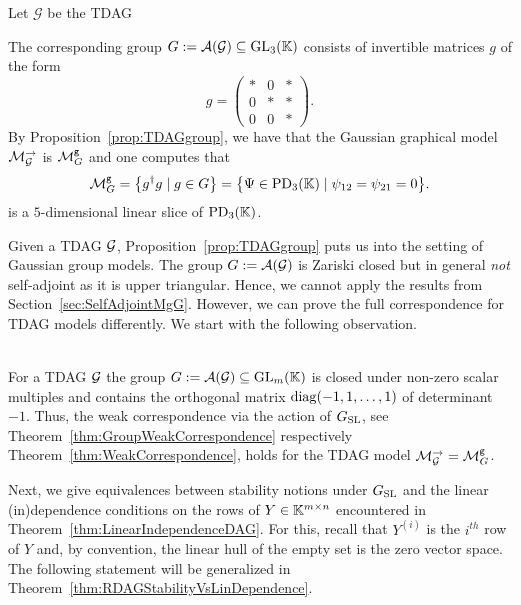 \begin{example}\label{ex:path1}
	Let $\mathcal{G}$ be the TDAG
	The corresponding group $G := \mathcal{A}(\mathcal{G}) \subseteq \operatorname{GL}_3(\mathbb K)$ consists of invertible matrices $g$ of the form
	\[g = \begin{pmatrix} * & 0 & * \\ 0 & * & * \\ 0 & 0 & * \end{pmatrix}.
	\]
	By Proposition~\ref{prop:TDAGgroup}, we have that the Gaussian graphical model $\mathcal{M}_{\mathcal{G}}^{\to}$ is $\mathcal{M}^{\mathtt{g}}_G$ and one computes that
	\begin{equation*}
		\mathcal{M}^{\mathtt{g}}_G = \big\{ g^{\dagger} g \mid g \in G \big\} = \big\{ \Psi \in \operatorname{PD}_3(\mathbb K) \mid \psi_{12}=\psi_{21}=0 \big\}.
	\end{equation*}
	is a $5$-dimensional linear slice of $\operatorname{PD}_3(\mathbb K)$.
	\hfill\exSymbol
\end{example}


Given a TDAG $\mathcal{G}$, Proposition~\ref{prop:TDAGgroup} puts us into the setting of Gaussian group models. 
The group $G := \mathcal{A}(\mathcal{G})$ is Zariski closed but in general \emph{not} self-adjoint as it is upper triangular. 
Hence, we cannot apply the results from Section~\ref{sec:SelfAdjointMgG}. However, we can prove the full correspondence for TDAG models differently. We start with the following observation.

\begin{remark} \label{rem:WeakCorrespondenceTDAG}
	\ \\
	For a TDAG $\mathcal{G}$ the group $G := \mathcal{A}(\mathcal{G}) \subseteq \operatorname{GL}_m(\mathbb K)$ is closed under non-zero scalar multiples and contains the orthogonal matrix $\operatorname{diag}(-1,1,\ldots,1)$ of determinant~$-1$. Thus, the weak correspondence via the action of $G_{\operatorname{SL}}$, see Theorem~\ref{thm:GroupWeakCorrespondence} respectively Theorem~\ref{thm:WeakCorrespondence}, holds for the TDAG model $\mathcal{M}_{\mathcal{G}}^{\to} = \mathcal{M}^{\mathtt{g}}_{G}$.
	\hfill\remSymbol
\end{remark}

Next, we give equivalences between stability notions under $G_{\operatorname{SL}}$ and the linear (in)dependence conditions on the rows of $Y \in \mathbb K^{m \times n}$ encountered in Theorem~\ref{thm:LinearIndependenceDAG}. For this, recall that $Y^{(i)}$ is the $i^{th}$ row of $Y$ and, by convention, the linear hull of the empty set is the zero vector space. The following statement will be generalized in Theorem~\ref{thm:RDAGStabilityVsLinDependence}.


